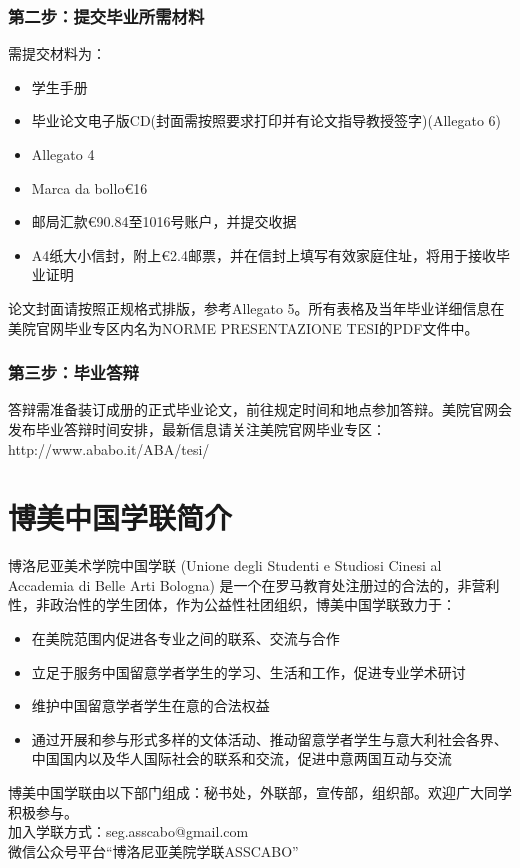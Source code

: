 \subsubsection{第二步：提交毕业所需材料}
需提交材料为：
\begin{itemize}
  \item 学生手册
  \item 毕业论文电子版CD(封面需按照要求打印并有论文指导教授签字)(Allegato 6)
  \item Allegato 4
  \item Marca da bollo€16
  \item 邮局汇款€90.84至1016号账户，并提交收据
  \item A4纸大小信封，附上€2.4邮票，并在信封上填写有效家庭住址，将用于接收毕业证明
\end{itemize}
论文封面请按照正规格式排版，参考Allegato 5。所有表格及当年毕业详细信息在美院官网毕业专区内名为NORME PRESENTAZIONE TESI的PDF文件中。


\subsubsection{第三步：毕业答辩}
答辩需准备装订成册的正式毕业论文，前往规定时间和地点参加答辩。美院官网会发布毕业答辩时间安排，最新信息请关注美院官网毕业专区：http://www.ababo.it/ABA/tesi/\\

\section{博美中国学联简介}
博洛尼亚美术学院中国学联 (Unione degli Studenti e Studiosi Cinesi al Accademia di Belle Arti Bologna) 是一个在罗马教育处注册过的合法的，非营利性，非政治性的学生团体，作为公益性社团组织，博美中国学联致力于：
\begin{itemize}
  \item 在美院范围内促进各专业之间的联系、交流与合作
  \item 立足于服务中国留意学者学生的学习、生活和工作，促进专业学术研讨
  \item 维护中国留意学者学生在意的合法权益
  \item 通过开展和参与形式多样的文体活动、推动留意学者学生与意大利社会各界、中国国内以及华人国际社会的联系和交流，促进中意两国互动与交流
\end{itemize}

博美中国学联由以下部门组成：秘书处，外联部，宣传部，组织部。欢迎广大同学积极参与。\\
加入学联方式：seg.asscabo@gmail.com\\
微信公众号平台“博洛尼亚美院学联ASSCABO”\\


